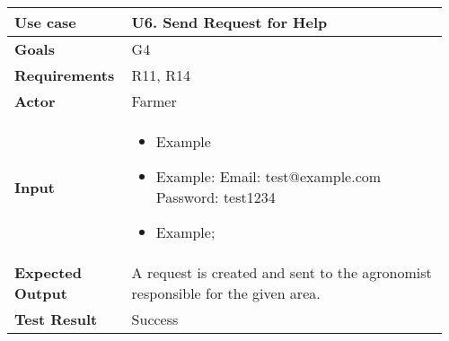 \begin{longtable}{@{}p{0.25\linewidth}p{0.71\linewidth}@{}}
	\toprule
	\textbf{Use case} & \textbf{U6.} Send Request for Help\\
	\midrule
	\textbf{Goals} & G4\\
	\midrule
	\textbf{Requirements} & R11, R14\\
	\midrule
	\textbf{Actor} & Farmer\\
	\midrule
	\textbf{Input} & \begin{itemize}[leftmargin=.4cm,noitemsep,topsep=0pt,before=\vspace{-3mm},after=\vspace{-4mm}]
		\item Example
		\item Example:\newline
		Email: test@example.com\newline
		Password: test1234
		\item Example;
	\end{itemize}\\
	\midrule
	\textbf{Expected Output} & A request is created and sent to the agronomist responsible for the given area.\\
	\midrule
	\textbf{Test Result} & Success\\
	\bottomrule
\end{longtable}